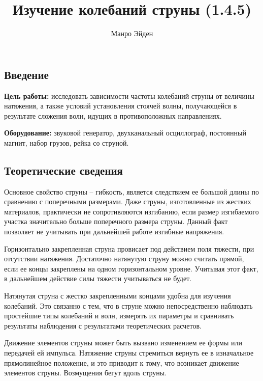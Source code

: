 \documentclass[a4paper, 12pt]{article}
\title{\textbf{Изучение колебаний струны (1.4.5)}}
\author{Манро Эйден}
\date{}
\begin{document}
\maketitle
	      	
    \begin{center}
    \section*{Введение}    
    \end{center}


    \noindent \textbf{Цель работы:} исследовать зависимости частоты колебаний струны от величины натяжения, а также условий установления стоячей волны, получающейся в результате сложения волн, идущих в противоположных направлениях.

    \bigskip

    \noindent \textbf{Оборудование:} звуковой генератор, двухканальный осциллограф, постоянный магнит, набор грузов, рейка со струной.

    \bigskip
    
    \begin{center}
         \subsection*{Теоретические сведения}
    \end{center}
    
    \par Основное свойство струны -- гибкость, является следствием ее большой длины по сравнению с поперечными размерами. Даже струны, изготовленные из жестких материалов, практически не сопротивляются изгибанию, если размер изгибаемого участка значительно больше поперечного размера струны. Данный факт позволяет не учитывать при дальнейшей работе изгибные напряжения.
	
	Горизонтально закрепленная струна провисает под действием поля тяжести, при отсутствии натяжения. Достаточно натянутую струну можно считать прямой, если ее концы закреплены на одном горизонтальном уровне. Учитывая этот факт, в дальнейшем действие силы тяжести учитываться не будет.
	
	Натянутая струна с жестко закрепленными концами удобна для изучения колебаний. Это связанно с тем, что в струне можно непосредственно наблюдать простейшие типы колебаний и волн, измерять их параметры и сравнивать результаты наблюдения с результатами теоретических расчетов.
	
	Движение элементов струны может быть вызвано изменением ее формы или передачей ей импульса. Натяжение струны стремиться вернуть ее в изначальное прямолинейное положение, и это приводит к тому, что возникает движение элементов струны. Возмущения бегут вдоль струны.
	
\end{document}
